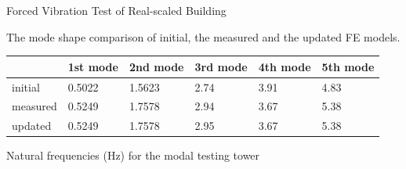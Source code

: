 \documentclass[usepdftitle=false]{beamer}
\begin{document}
\begin{frame}{Forced Vibration Test of Real-scaled Building}
\begin{figure}[!ht]
\centering
\setcounter{subfigure}{0}
\label{fig:7-6}
\end{figure}
The mode shape comparison of initial, the measured and the updated FE models.

\begin{table}[ht]
\centering
\begin{tabularx}{\textwidth}{@{}X|X|X|X|X|X@{}}
\toprule[1pt]\midrule[0.3pt]
& 1st mode & 2nd mode & 3rd mode & 4th mode & 5th mode\\ \midrule[0.3pt]
initial & 0.5022 & 1.5623 & 2.74 & 3.91 & 4.83\\
measured& 0.5249 & 1.7578 & 2.94 & 3.67 & 5.38\\
updated & 0.5249 & 1.7578 & 2.95 & 3.67 & 5.38\\
\bottomrule
\end{tabularx}
\label{tab:7-3}
\end{table}
Natural frequencies (Hz) for the modal testing tower
\end{frame}
\end{document}
